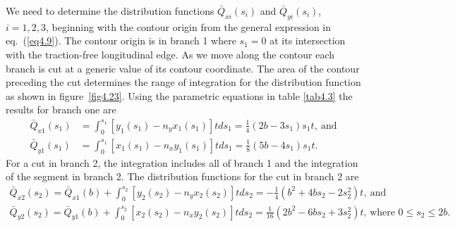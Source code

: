 \documentclass{AeroStructure-ERJohnson}
\begin{document}
\begin{example}
We need to determine the distribution functions $\bar{Q}_{x i}\left(s_{i}\right)$ and $\bar{Q}_{y i}\left(s_{i}\right)$, $i=1,2,3$, beginning with the contour origin from the general expression in eq.~(\ref{eq4.9}). The contour origin is in branch 1 where $s_{1}=0$ at its intersection with the traction-free longitudinal edge. As we move along the contour each branch is cut at a generic value of its contour coordinate. The area of the contour preceding the cut determines the range of integration for the distribution function as shown in figure~\ref{fig4.23}. Using the parametric equations in table \ref{tab4.3} the results for branch one are
\begin{align}
\bar{Q}_{x 1}\left(s_{1}\right)&=\int_{0}^{s_{1}}\left[y_{1}\left(s_{1}\right)-n_{y} x_{1}\left(s_{1}\right)\right] t d s_{1}=\frac{1}{4}\left(2 b-3 s_{1}\right) s_{1} t,\ \text{and}\nonumber\\
\bar{Q}_{y 1}\left(s_{1}\right)&=\int_{0}^{s_{1}}\left[x_{1}\left(s_{1}\right)-n_{x} y_{1}\left(s_{1}\right)\right] t d s_{1}=\frac{1}{8}\left(5 b-4 s_{1}\right) s_{1} t.\label{ex4.6g}
\end{align}
\noindent For a cut in branch 2, the integration includes all of branch 1 and the integration of the segment in branch 2. The distribution functions for the cut in branch 2 are\vspace*{-1\baselineskip}
{\def\thefigure{4.23}
}
\pagebreak
\begin{gather}
\bar{Q}_{x 2}\left(s_{2}\right)=\bar{Q}_{x 1}(b)+\int_{0}^{s_{2}}\left[y_{2}\left(s_{2}\right)-n_{y} x_{2}(s_{2})\right] t d s_{2}=-\frac{1}{4}(b^{2}+4 b s_{2}-2 s_{2}^{2}) t,\ \text{and}\label{ex4.6h}\\
\bar{Q}_{y 2}\left(s_{2}\right)=\bar{Q}_{y 1}(b)+\int_{0}^{s_{2}}\left[x_{2}\left(s_{2}\right)-n_{x} y_{2}\left(s_{2}\right)\right] t d s_{2}=\frac{1}{16}(2 b^{2}-6 b s_{2}+3 s_{2}^{2}) t,\,\textrm{where } 0 \leq s_{2} \leq 2 b.\label{ex4.6i}

\end{gather}
\end{example}
\end{document}
